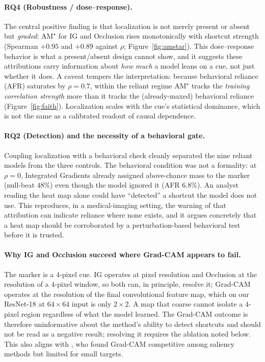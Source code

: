 \documentclass[11pt]{article}
\begin{document}
\paragraph{RQ4 (Robustness / dose--response).} The central positive finding is that localization is
not merely present or absent but \emph{graded}: $\mathrm{AM}^{\star}$ for IG and Occlusion rises
monotonically with shortcut strength (Spearman $+0.95$ and $+0.89$ against $\rho$;
Figure~\ref{fig:amstar}). This dose--response behavior is what a present/absent design cannot show,
and it suggests these attributions carry information about \emph{how much} a model leans on a cue,
not just whether it does. A caveat tempers the interpretation: because behavioral reliance (AFR)
saturates by $\rho=0.7$, within the reliant regime $\mathrm{AM}^{\star}$ tracks the \emph{training
correlation strength} more than it tracks the (already-maxed) behavioral reliance
(Figure~\ref{fig:faith}). Localization scales with the cue's statistical dominance, which is not the
same as a calibrated readout of causal dependence.

\paragraph{RQ2 (Detection) and the necessity of a behavioral gate.} Coupling localization with a
behavioral check cleanly separated the nine reliant models from the three controls. The behavioral
condition was not a formality: at $\rho=0$, Integrated Gradients already assigned above-chance mass
to the marker (null-beat $48\%$) even though the model ignored it (AFR $6.8\%$). An analyst reading
the heat map alone could have ``detected'' a shortcut the model does not use. This reproduces, in a
medical-imaging setting, the warning of \citet{adebayo2022posthoc} that attribution can indicate
reliance where none exists, and it argues concretely that a heat map should be corroborated by a
perturbation-based behavioral test before it is trusted.

\paragraph{Why IG and Occlusion succeed where Grad-CAM appears to fail.} The marker is a $4$-pixel
cue. IG operates at pixel resolution and Occlusion at the resolution of a $4$-pixel window, so both
can, in principle, resolve it; Grad-CAM operates at the resolution of the final convolutional
feature map, which on our ResNet-18 at $64\times64$ input is only $2\times2$. A map that coarse
cannot isolate a $4$-pixel region regardless of what the model learned. The Grad-CAM outcome is
therefore uninformative about the method's ability to detect shortcuts and should not be read as a
negative result; resolving it requires the ablation noted below. This also aligns with
\citet{saporta2022benchmarking}, who found Grad-CAM competitive among saliency methods but limited
for small targets.
\end{document}
